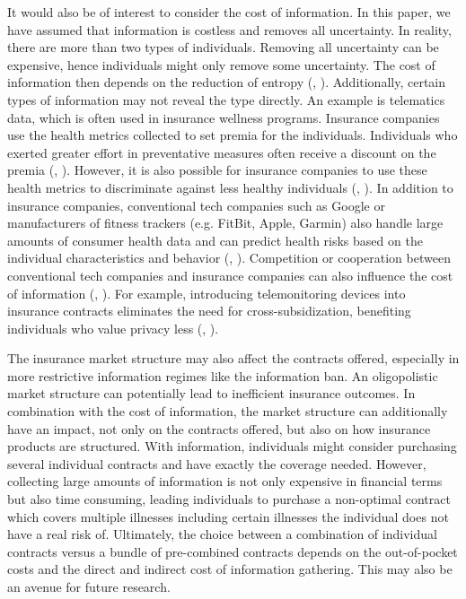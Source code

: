 \documentclass[natbib=false,preprint,12pt]{elsarticle}
\theoremstyle{plain}
\theoremstyle{definition}
\theoremstyle{plain}
\theoremstyle{TheoremNum}
\theoremstyle{CorollaryNum}
\theoremstyle{PropositionNum}
\theoremstyle{TheoremNum}
\begin{document}
It would also be of interest to consider the cost of information. In this paper, we have assumed that information is costless and removes all uncertainty. In reality, there are more than two types of individuals. Removing all uncertainty can be expensive, hence individuals might only remove some uncertainty. The cost of information then depends on the reduction of entropy (\citeauthor{shannon1948mathematical}, 
\citeyear{shannon1948mathematical}). Additionally, certain types of information may not reveal the type directly. An example is telematics data, which is often used in insurance wellness programs. Insurance companies use the health metrics collected to set premia for the individuals. Individuals who exerted greater effort in preventative measures often receive a discount on the premia (\citeauthor{sharpe2019telematics}, \citeyear{sharpe2019telematics}). However, it is also possible for insurance companies to use these health metrics to discriminate against less healthy individuals (\citeauthor{prince2020insurancewellness}, \citeyear{prince2020insurancewellness}). In addition to insurance companies, conventional tech companies such as Google or manufacturers of fitness trackers (e.g. FitBit, Apple, Garmin) also handle large amounts of consumer health data and can predict health risks based on the individual characteristics and behavior (\citeauthor{bourreau2020google}, \citeyear{bourreau2020google}). Competition or cooperation between conventional tech companies and insurance companies can also influence the cost of information (\citeauthor{pasquale2013protecting}, \citeyear{pasquale2013protecting}). For example, introducing telemonitoring devices into insurance contracts eliminates the need for cross-subsidization, benefiting individuals who value privacy less (\citeauthor{gemmo2019privacy}, \citeyear{gemmo2019privacy}).

The insurance market structure may also affect the contracts offered, especially in more restrictive information regimes like the information ban. An oligopolistic market structure can potentially lead to inefficient insurance outcomes. In combination with the cost of information, the market structure can additionally have an impact, not only on the contracts offered, but also on how insurance products are structured. With information, individuals might consider purchasing several individual contracts and have exactly the coverage needed. However, collecting large amounts of information is not only expensive in financial terms but also time consuming, leading individuals to purchase a non-optimal contract which covers multiple illnesses including certain illnesses the individual does not have a real risk of. Ultimately, the choice between a combination of individual contracts versus a bundle of pre-combined contracts depends on the out-of-pocket costs and the direct and indirect cost of information gathering. This may also be an avenue for future research.
\end{document}
